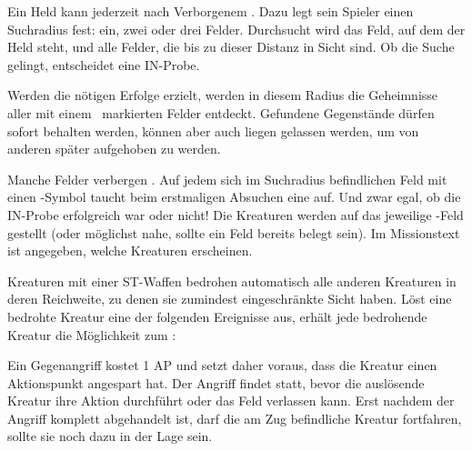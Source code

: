 {		
			Ein Held kann jederzeit nach Verborgenem . Dazu legt sein Spieler einen Suchradius fest: ein, zwei oder drei Felder. Durchsucht wird das Feld, auf dem der Held steht, und alle Felder, die bis zu dieser Distanz in Sicht sind. Ob die Suche gelingt, entscheidet eine IN-Probe.


			\noindent
			Werden die nötigen Erfolge erzielt, werden in diesem Radius die Geheimnisse aller mit einem \search~markierten Felder entdeckt. Gefundene Gegenstände dürfen sofort behalten werden, können aber auch liegen gelassen werden, um von anderen später aufgehoben zu werden.

			Manche Felder verbergen . Auf jedem sich im Suchradius befindlichen Feld mit einen \monster-Symbol taucht beim erstmaligen Absuchen eine auf. Und zwar egal, ob die IN-Probe erfolgreich war oder nicht! Die Kreaturen werden auf das jeweilige \monster-Feld gestellt (oder möglichst nahe, sollte ein Feld bereits belegt sein). Im Missionstext ist angegeben, welche Kreaturen erscheinen.

		Kreaturen mit einer ST-Waffen bedrohen automatisch alle anderen Kreaturen in deren Reichweite, zu denen sie zumindest eingeschränkte Sicht haben. Löst eine bedrohte Kreatur eine der folgenden Ereignisse aus, erhält jede bedrohende Kreatur die Möglichkeit zum :


		\noindent
		Ein Gegenangriff kostet 1 AP und setzt daher voraus, dass die Kreatur einen Aktionspunkt angespart hat. Der Angriff findet statt, bevor die auslösende Kreatur ihre Aktion durchführt oder das Feld verlassen kann. Erst nachdem der Angriff komplett abgehandelt ist, darf die am Zug befindliche Kreatur fortfahren, sollte sie noch dazu in der Lage sein.

}
